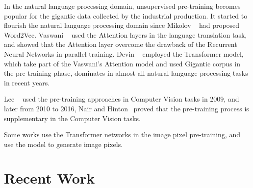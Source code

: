 \documentclass[10pt,twocolumn,letterpaper]{article}
\begin{document}
  In the natural language processing domain, unsupervised pre-training becomes popular for the gigantic data collected by the industrial production.
  It started to flourish the natural language processing domain since Mikolov \etal~\cite{mikolov2013distributed} had proposed Word2Vec.
  Vaswani \etal~\cite{vaswani2017attention} used the Attention layers in the language translation task, and showed that the Attention layer overcome the drawback of the Recurrent Neural Networks
in parallel training. Devin \etal~\cite{devlin2019bert} employed the Transformer model, which take part of the Vaswani's Attention model and used Gigantic corpus in the pre-training phase, dominates in almost all natural language processing tasks in recent years.

  Lee \etal~\cite{lee2009convolutional} used the pre-training approaches in Computer Vision tasks in 2009, and later from 2010 to 2016,
  Nair and Hinton~\cite{nair2010rectified} proved that the pre-training process is supplementary in the Computer Vision tasks.

  Some works use the Transformer networks in the image pixel pre-training, and use the model to generate image pixels.








\section{Recent Work}
\end{document}
